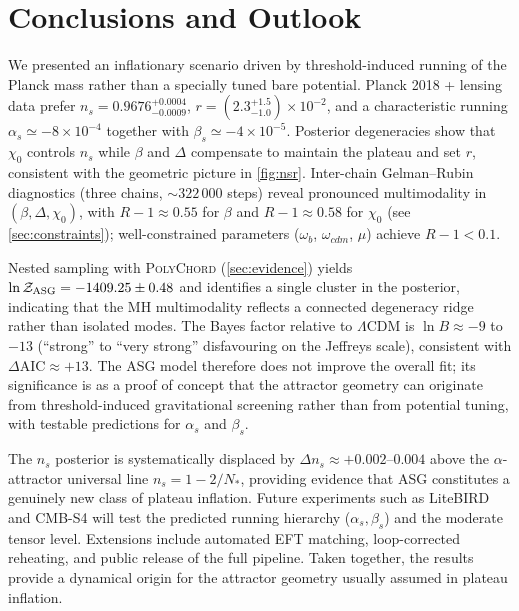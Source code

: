 \documentclass[11pt,a4paper]{article}
\begin{document}
\section{Conclusions and Outlook}
We presented an inflationary scenario driven by threshold-induced running of the Planck mass rather than a specially tuned bare potential. Planck 2018 + lensing data prefer $n_{s}=0.9676^{+0.0004}_{-0.0009}$, $r=(2.3^{+1.5}_{-1.0})\times10^{-2}$, and a characteristic running $\alpha_{s}\simeq-8\times10^{-4}$ together with $\beta_{s}\simeq-4\times10^{-5}$. Posterior degeneracies show that $\chi_{0}$ controls $n_{s}$ while $\beta$ and $\Delta$ compensate to maintain the plateau and set $r$, consistent with the geometric picture in \cref{fig:nsr}. Inter-chain Gelman--Rubin diagnostics (three chains, ${\sim}322\,000$ steps) reveal pronounced multimodality in $(\beta,\Delta,\chi_0)$, with $R{-}1\approx0.55$ for $\beta$ and $R{-}1\approx0.58$ for $\chi_0$ (see \cref{sec:constraints}); well-constrained parameters ($\omega_b$, $\omega_{cdm}$, $\mu$) achieve $R{-}1<0.1$.

Nested sampling with \textsc{PolyChord} (\cref{sec:evidence}) yields $\ln\mathcal{Z}_{\rm ASG}=-1409.25\pm0.48$ and identifies a single cluster in the posterior, indicating that the MH multimodality reflects a connected degeneracy ridge rather than isolated modes. The Bayes factor relative to $\Lambda$CDM is $\ln B\approx-9$ to $-13$ (``strong'' to ``very strong'' disfavouring on the Jeffreys scale), consistent with $\Delta\text{AIC}\approx+13$. The ASG model therefore does not improve the overall fit; its significance is as a proof of concept that the attractor geometry can originate from threshold-induced gravitational screening rather than from potential tuning, with testable predictions for $\alpha_s$ and $\beta_s$.

The $n_s$ posterior is systematically displaced by $\Delta n_s\approx+0.002$--$0.004$ above the $\alpha$-attractor universal line $n_s=1-2/N_*$, providing evidence that ASG constitutes a genuinely new class of plateau inflation. Future experiments such as LiteBIRD and CMB-S4 will test the predicted running hierarchy ($\alpha_{s},\beta_{s}$) and the moderate tensor level. Extensions include automated EFT matching, loop-corrected reheating, and public release of the full pipeline. Taken together, the results provide a dynamical origin for the attractor geometry usually assumed in plateau inflation.
\end{document}
